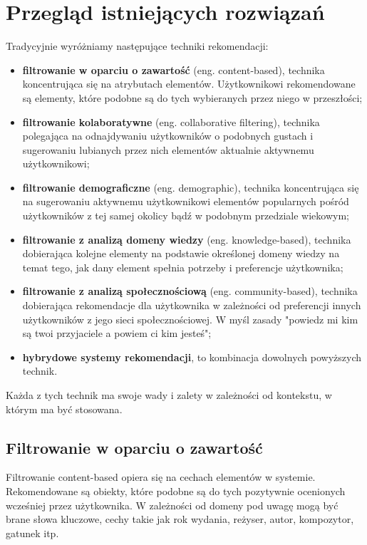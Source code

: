 \documentclass[twoside]{iisthesis}
\begin{document}
 
 \chapter{Przegląd istniejących rozwiązań}
	 Tradycyjnie wyróżniamy następujące techniki rekomendacji: 
	 
	 \begin{itemize}
	 	\item \textbf{filtrowanie w oparciu o zawartość} (eng. content-based), technika koncentrująca się na atrybutach elementów. Użytkownikowi rekomendowane są elementy, które podobne są do tych wybieranych przez niego w przeszłości;
	 	\item \textbf{filtrowanie kolaboratywne} (eng. collaborative filtering), technika polegająca na odnajdywaniu użytkowników o podobnych gustach i sugerowaniu lubianych przez nich elementów aktualnie aktywnemu użytkownikowi;
	 	\item \textbf{filtrowanie demograficzne} (eng. demographic), technika koncentrująca się na sugerowaniu aktywnemu użytkownikowi elementów popularnych pośród użytkowników z tej samej okolicy bądź w podobnym przedziale wiekowym;
	 	\item \textbf{filtrowanie z analizą domeny wiedzy} (eng. knowledge-based), technika dobierająca kolejne elementy na podstawie określonej domeny wiedzy na temat tego, jak dany element spełnia potrzeby i preferencje użytkownika;	
	 	\item \textbf{filtrowanie z analizą społecznościową} (eng. community-based), technika dobierająca rekomendacje dla użytkownika w zależności od preferencji innych użytkowników z jego sieci społecznościowej. W myśl zasady "powiedz mi kim są twoi przyjaciele a powiem ci kim jesteś";
	 	\item \textbf{hybrydowe systemy rekomendacji}, to kombinacja dowolnych powyższych technik.
	 \end{itemize}
	 
	 Każda z tych technik ma swoje wady i zalety w zależności od kontekstu, w którym ma być stosowana\cite{id:IntroductionToRecommenderSystemsHandbook}. 
	 
	 \section{Filtrowanie w oparciu o zawartość}
	 
	 Filtrowanie content-based opiera się na cechach elementów w systemie. Rekomendowane są obiekty, które podobne są do tych pozytywnie ocenionych wcześniej przez użytkownika\cite{id:huynh2012modeling}. W zależności od domeny pod uwagę mogą być brane słowa kluczowe, cechy takie jak rok wydania, reżyser, autor, kompozytor, gatunek itp.
	 
\end{document}
